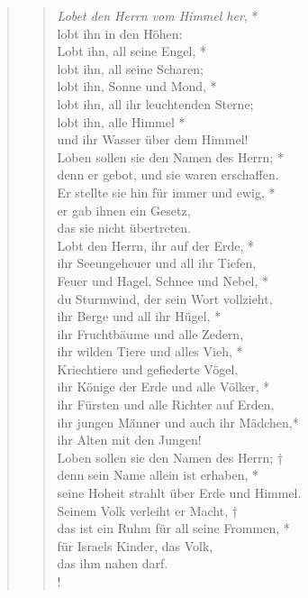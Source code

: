 
\begin{quote}
\begin{verse}

\textit{Lobet den Herrn vom Himmel her}, *\\
lobt ihn in den Höhen:\\
\vin Lobt ihn, all seine Engel, *\\
\vin lobt ihn, all seine Scharen;\\
lobt ihn, Sonne und Mond, *\\
lobt ihn, all ihr leuchtenden Sterne;\\
\vin lobt ihn, alle Himmel *\\
\vin und ihr Wasser über dem Himmel!\\
Loben sollen sie den Namen des Herrn; *\\
denn er gebot, und sie waren erschaffen.\\
\vin Er stellte sie hin für immer und ewig, *\\
\vin er gab ihnen ein Gesetz,\\
\vin das sie nicht übertreten.\\
Lobt den Herrn, ihr auf der Erde, *\\
ihr Seeungeheuer und all ihr Tiefen,\\
\vin Feuer und Hagel, Schnee und Nebel, *\\
\vin du Sturmwind, der sein Wort vollzieht,\\
ihr Berge und all ihr Hügel, *\\
ihr Fruchtbäume und alle Zedern,\\
\vin ihr wilden Tiere und alles Vieh, *\\
\vin Kriechtiere und gefiederte Vögel,\\
ihr Könige der Erde und alle Völker, *\\
ihr Fürsten und alle Richter auf Erden,\\
\vin ihr jungen Männer und auch ihr Mädchen,*\\
\vin ihr Alten mit den Jungen!\\
Loben sollen sie den Namen des Herrn; †\\
denn sein Name allein ist erhaben, *\\
seine Hoheit strahlt über Erde und Himmel.\\
\vin Seinem Volk verleiht er Macht, †\\
\vin das ist ein Ruhm für all seine Frommen, *\\
\vin für Israels Kinder, das Volk,\\ 
\vin das ihm nahen darf.\\!
\end{verse}
\end{quote}

